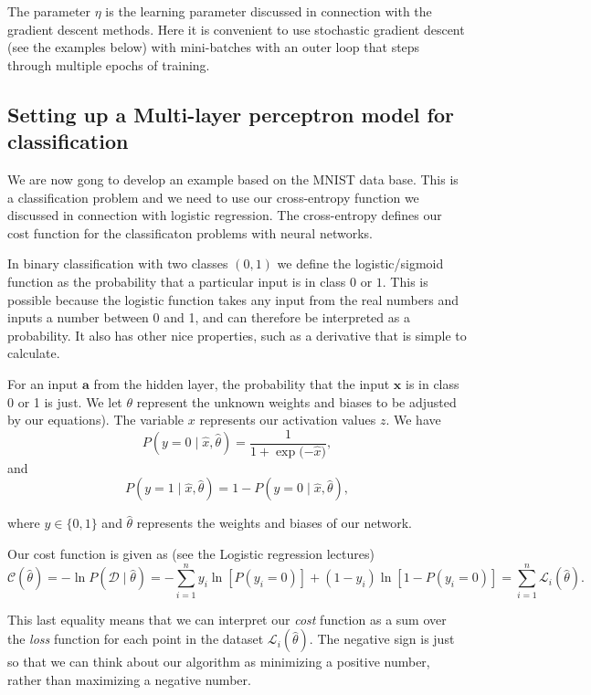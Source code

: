The parameter $\eta$ is the learning parameter discussed in connection with the gradient descent methods.
Here it is convenient to use stochastic gradient descent (see the examples below) with mini-batches with an outer loop that steps through multiple epochs of training.

\subsection*{Setting up a Multi-layer perceptron model for classification}

We are now gong to develop an example based on the MNIST data
base. This is a classification problem and we need to use our
cross-entropy function we discussed in connection with logistic
regression. The cross-entropy defines our cost function for the
classificaton problems with neural networks.

In binary classification with two classes $(0, 1)$ we define the
logistic/sigmoid function as the probability that a particular input
is in class $0$ or $1$.  This is possible because the logistic
function takes any input from the real numbers and inputs a number
between 0 and 1, and can therefore be interpreted as a probability. It
also has other nice properties, such as a derivative that is simple to
calculate.

For an input $\boldsymbol{a}$ from the hidden layer, the probability that the input $\boldsymbol{x}$
is in class 0 or 1 is just. We let $\theta$ represent the unknown weights and biases to be adjusted by our equations). The variable $x$
represents our activation values $z$. We have
\[
P(y = 0 \mid \hat{x}, \hat{\theta}) = \frac{1}{1 + \exp{(- \hat{x}})} ,
\]
and
\[
P(y = 1 \mid \hat{x}, \hat{\theta}) = 1 - P(y = 0 \mid \hat{x}, \hat{\theta}) ,
\]

where $y \in \{0, 1\}$  and $\hat{\theta}$ represents the weights and biases
of our network.


Our cost function is given as (see the Logistic regression lectures)
\[
\mathcal{C}(\hat{\theta}) = - \ln P(\mathcal{D} \mid \hat{\theta}) = - \sum_{i=1}^n
y_i \ln[P(y_i = 0)] + (1 - y_i) \ln [1 - P(y_i = 0)] = \sum_{i=1}^n \mathcal{L}_i(\hat{\theta}) .
\]

This last equality means that we can interpret our \emph{cost} function as a sum over the \emph{loss} function
for each point in the dataset $\mathcal{L}_i(\hat{\theta})$.  
The negative sign is just so that we can think about our algorithm as minimizing a positive number, rather
than maximizing a negative number.  

